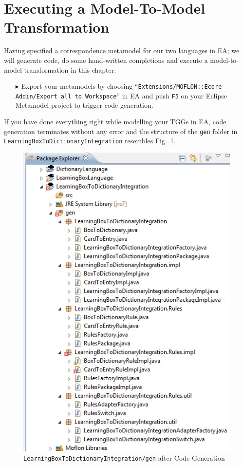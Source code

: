 \section{Executing a Model-To-Model Transformation}

Having specified a correspondence metamodel for our two languages in EA; we will generate code, do some hand-written completions and execute a model-to-model transformation in this chapter.

\begin{enumerate}
\item[$\blacktriangleright$] Export your metamodels by choosing ``\texttt{Extensions/\-MOFLON::\-Ecore Addin\-/Export all to Workspace}'' in EA and push \texttt{F5} on your Eclipse Metamodel project to trigger code generation.
\end{enumerate}

If you have done everything right while modelling your TGGs in EA, code generation terminates without any error and the structure of the \texttt{gen} folder in \texttt{LearningBox\-To\-Dictionary\-Integration} resembles Fig.~\ref{fig:gen_folder}.

\begin{figure}[htbp]
\begin{center}
  \includegraphics[width=\textwidth]{pics/tggBilder/transformation/tgg22}
  \caption{\texttt{LearningBox\-To\-Dictionary\-Integration/gen} after Code Generation}  
  \label{fig:gen_folder}
\end{center}
\end{figure} 

